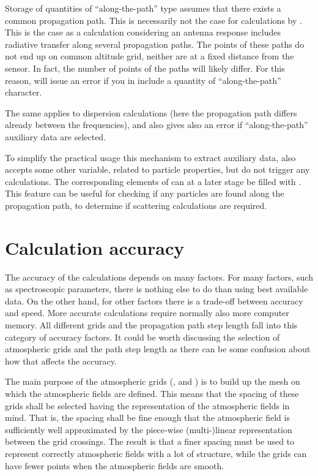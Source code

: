 Storage of quantities of ``along-the-path'' type assumes that there exists a
common propagation path. This is necessarily not the case for calculations by
. This is the case as a calculation considering an antenna
response includes radiative transfer along several propagation paths. The
points of these paths do not end up on common altitude grid, neither are at a
fixed distance from the sensor. In fact, the number of points of the paths will
likely differ. For this reason,  will issue an error if you
in  include a quantity of ``along-the-path'' character.

The same applies to dispersion calculations (here the propagation path differs
already between the frequencies), and also  gives
also an error if ``along-the-path'' auxiliary data are selected.

To simplify the practical usage this mechanism to extract auxiliary data,
 also accepts some other variable, related to
particle properties, but do not trigger any calculations. The corresponding
elements of  can at a later stage be filled with
. This feature can be useful for
checking if any particles are found along the propagation path, to determine if
scattering calculations are required.



\section{Calculation accuracy}
\label{sec:fm_defs:accuracy}

The accuracy of the calculations depends on many factors. For many
factors, such as spectroscopic parameters, there is nothing else to do
than using best available data. On the other hand, for other factors
there is a trade-off between accuracy and speed. More accurate
calculations require normally also more computer memory. All
different grids and the propagation path step length fall into this
category of accuracy factors. It could be worth discussing the
selection of atmospheric grids and the path step length as there can
be some confusion about how that affects the accuracy.

The main purpose of the atmospheric grids (,
 and ) is to build up the
mesh on which the atmospheric fields are defined. This means that the
spacing of these grids shall be selected having the representation of
the atmospheric fields in mind. That is, the spacing shall be fine
enough that the atmospheric field is sufficiently well approximated by
the piece-wise (multi-)linear representation between the grid
crossings. The result is that a finer spacing must be used to
represent correctly atmospheric fields with a lot of structure, while
the grids can have fewer points when the atmospheric fields are
smooth. 


